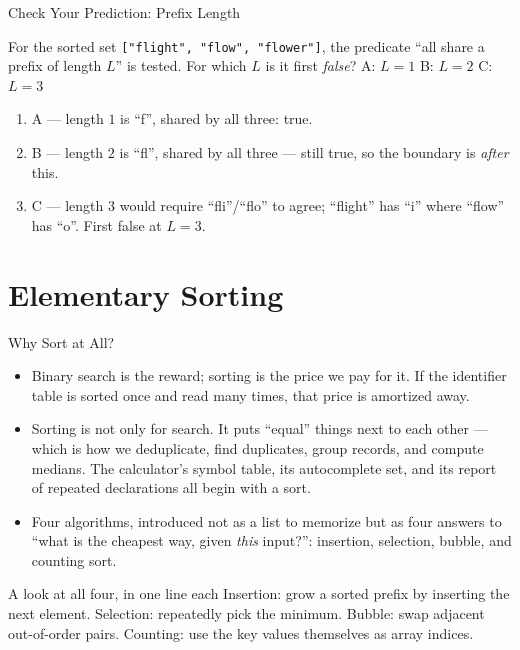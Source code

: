 \documentclass[aspectratio=169]{beamer}
\begin{document}
\begin{frame}{Check Your Prediction: Prefix Length}
  \begin{block}{For the sorted set \texttt{["flight", "flow", "flower"]}, the
    predicate ``all share a prefix of length $L$'' is tested. For which $L$
    is it first \emph{false}?}
    A: $L = 1$ \quad B: $L = 2$ \quad C: $L = 3$
  \end{block}
  \begin{enumerate}
    \item A --- length $1$ is ``f'', shared by all three: true.
    \item B --- length $2$ is ``fl'', shared by all three --- still true, so
      the boundary is \emph{after} this.
    \item C --- length $3$ would require ``fli''/\allowbreak ``flo'' to agree;
      ``flight'' has ``i'' where ``flow'' has ``o''. First false at $L = 3$.
  \end{enumerate}
\end{frame}


\section{Elementary Sorting}


\begin{frame}{Why Sort at All?}
  \begin{itemize}
    \item Binary search is the reward; sorting is the price we pay for it.
      If the identifier table is sorted once and read many times, that price
      is amortized away.
    \item Sorting is not only for search. It puts ``equal'' things next to
      each other --- which is how we deduplicate, find duplicates, group
      records, and compute medians. The calculator's symbol table, its
      autocomplete set, and its report of repeated declarations all begin
      with a sort.
    \item Four algorithms, introduced not as a list to memorize but as four
      answers to ``what is the cheapest way, given \emph{this} input?'':
      insertion, selection, bubble, and counting sort.
  \end{itemize}
  \begin{exampleblock}{A look at all four, in one line each}
    Insertion: grow a sorted prefix by inserting the next element. Selection:
    repeatedly pick the minimum. Bubble: swap adjacent out-of-order pairs.
    Counting: use the key values themselves as array indices.
  \end{exampleblock}
\end{frame}
\end{document}
